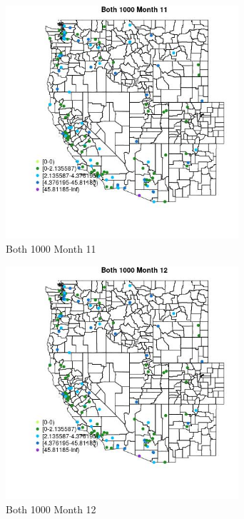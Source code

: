 \begin{figure} 
\centering  
\includegraphics[width=0.77\textwidth]{Code_Outputs/Report_ML_input_PM25_Step4_part_e_de_duplicated_aves_MapObsMo11Both_1000.jpg} 
\caption{\label{fig:Report_ML_input_PM25_Step4_part_e_de_duplicated_avesMapObsMo11Both_1000}Both 1000 Month 11} 
\end{figure} 
 

\begin{figure} 
\centering  
\includegraphics[width=0.77\textwidth]{Code_Outputs/Report_ML_input_PM25_Step4_part_e_de_duplicated_aves_MapObsMo12Both_1000.jpg} 
\caption{\label{fig:Report_ML_input_PM25_Step4_part_e_de_duplicated_avesMapObsMo12Both_1000}Both 1000 Month 12} 
\end{figure} 
 

